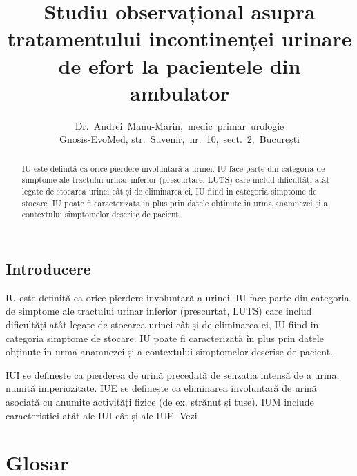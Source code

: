 \documentclass[9pt,draft]{article}
\title{Studiu observațional asupra tratamentului incontinenței urinare de efort la pacientele din ambulator}
\author{Dr.~Andrei~Manu-Marin,~medic~primar~urologie\\Gnosis-EvoMed, str.~Suvenir,~nr.~10,~sect.~2,~București}
\date{}
\begin{document}
  \setlength{\columnsep}{25pt}
  \maketitle
  \linenumbers
  
  \begin{abstract}
	\ac{IU} este definită ca orice pierdere involuntară a urinei. \ac{IU} face parte din categoria de simptome ale tractului urinar inferior (prescurtare: \ac{LUTS}) care includ dificultăți atât legate de stocarea urinei cât și de eliminarea ei, \ac{IU} fiind in categoria simptome de stocare. \ac{IU} poate fi caracterizată în plus prin datele obținute în urma anamnezei și a contextului simptomelor descrise de pacient.  
  \end{abstract}
  
  \begin{multicols}{2}
  \section{Introducere}
	\ac{IU} este definită ca orice pierdere involuntară a urinei. \ac{IU} face parte din categoria de simptome ale tractului urinar inferior (prescurtat, \ac{LUTS}) care includ dificultăți atât legate de stocarea urinei cât și de eliminarea ei, \ac{IU} fiind in categoria simptome de stocare. \ac{IU} poate fi caracterizată în plus prin datele obținute în urma anamnezei și a contextului simptomelor descrise de pacient.  

	\ac{IUI} se definește ca pierderea de urină precedată de senzatia intensă de a urina, numită imperiozitate. \ac{IUE} se definește ca eliminarea involuntară de urină asociată cu anumite activități fizice (de ex. strănut și tuse). \ac{IUM} include caracteristici atât ale \ac{IUI} cât și ale \ac{IUE}. Vezi \citep{ihaka1996,venables1999}
  \end{multicols}
  
  
  
  
  \section*{Glosar}
  \begin{acronym}[LUTS]
  \end{acronym}
\end{document}

